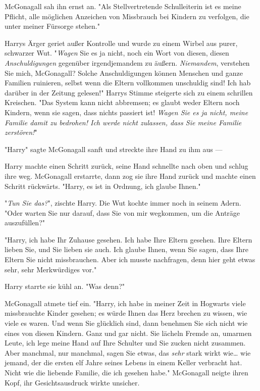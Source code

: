 {McGonagall sah ihn ernst an. "Als Stellvertretende Schulleiterin ist es meine Pflicht, alle möglichen Anzeichen von Missbrauch bei Kindern zu verfolgen, die unter meiner Fürsorge stehen."

Harrys Ärger geriet außer Kontrolle und wurde zu einem Wirbel aus purer, schwarzer Wut. "\emph{Wagen} Sie es ja nicht, noch ein Wort von diesen, diesen \emph{Anschuldigungen} gegenüber irgendjemandem zu äußern. \emph{Niemandem}, verstehen Sie mich, McGonagall? Solche Anschuldigungen können Menschen und ganze Familien ruinieren, selbst wenn die Eltern vollkommen unschuldig sind! Ich hab darüber in der Zeitung gelesen!" Harrys Stimme steigerte sich zu einem schrillen Kreischen. "Das System kann nicht abbremsen; es glaubt weder Eltern noch Kindern, wenn sie sagen, dass nichts passiert ist! \emph{Wagen Sie es ja nicht, meine Familie damit zu bedrohen! Ich werde nicht zulassen, dass Sie meine Familie zerstören!}"

"Harry" sagte McGonagall sanft und streckte ihre Hand zu ihm aus ---

Harry machte einen Schritt zurück, seine Hand schnellte nach oben und schlug ihre weg. McGonagall erstarrte, dann zog sie ihre Hand zurück und machte einen Schritt rückwärts. "Harry, es ist in Ordnung, ich glaube Ihnen."

"\emph{Tun Sie das?}", zischte Harry. Die Wut kochte immer noch in seinem Adern. "Oder warten Sie nur darauf, dass Sie von mir wegkommen, um die Anträge auszufüllen?"

"Harry, ich habe Ihr Zuhause gesehen. Ich habe Ihre Eltern gesehen. Ihre Eltern lieben Sie, und Sie lieben sie auch. Ich glaube Ihnen, wenn Sie sagen, dass Ihre Eltern Sie nicht missbrauchen. Aber ich musste nachfragen, denn hier geht etwas sehr, sehr Merkwürdiges vor."

Harry starrte sie kühl an. "Was denn?"

McGonagall atmete tief ein. "Harry, ich habe in meiner Zeit in Hogwarts viele missbrauchte Kinder gesehen; es würde Ihnen das Herz brechen zu wissen, wie viele es waren. Und wenn Sie glücklich sind, dann benehmen Sie sich nicht wie eines von diesen Kindern. Ganz und gar nicht. Sie lächeln Fremde an, umarmen Leute, ich lege meine Hand auf Ihre Schulter und Sie zucken nicht zusammen. Aber manchmal, nur manchmal, sagen Sie etwas, das \emph{sehr} stark wirkt wie… wie jemand, der die ersten elf Jahre seines Lebens in einem Keller verbracht hat. Nicht wie die liebende Familie, die ich gesehen habe." McGonagall neigte ihren Kopf, ihr Gesichtsausdruck wirkte unsicher.

}
